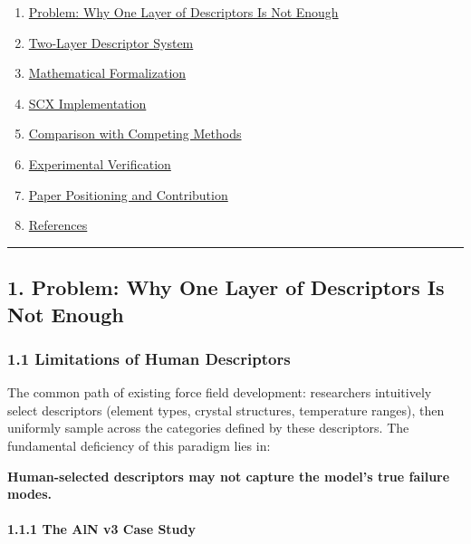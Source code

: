 \documentclass[
  12pt,
]{article}
\providecommand{\tightlist}{%
  \setlength{\itemsep}{0pt}\setlength{\parskip}{0pt}}
\begin{document}
\begin{enumerate}
\def\labelenumi{\arabic{enumi}.}
\tightlist
\item
  \hyperref[1-problem-why-one-layer-descriptors-are-insufficient]{Problem: Why One Layer of Descriptors Is Not Enough}
\item
  \hyperref[2-two-layer-descriptor-system]{Two-Layer Descriptor System}
\item
  \hyperref[3-mathematical-formalization]{Mathematical Formalization}
\item
  \hyperref[4-scx-implementation]{SCX Implementation}
\item
  \hyperref[5-comparison-with-competition-methods]{Comparison with Competing Methods}
\item
  \hyperref[6-experiment-verification]{Experimental Verification}
\item
  \hyperref[7-paper-positioning-and-contribution]{Paper Positioning and Contribution}
\item
  \hyperref[8-references]{References}
\end{enumerate}

\begin{center}\rule{0.5\linewidth}{0.5pt}\end{center}

\subsection{1. Problem: Why One Layer of Descriptors Is Not Enough}\label{problem-why-one-layer-descriptors-are-insufficient}

\subsubsection{1.1 Limitations of Human Descriptors}\label{limitations-of-human-descriptors}

The common path of existing force field development: researchers intuitively select descriptors (element types, crystal structures, temperature ranges), then uniformly sample across the categories defined by these descriptors. The fundamental deficiency of this paradigm lies in:

\textbf{Human-selected descriptors may not capture the model's true failure modes.}

\paragraph{1.1.1 The AlN v3 Case Study}\label{aln-v3-case-study}
\end{document}
